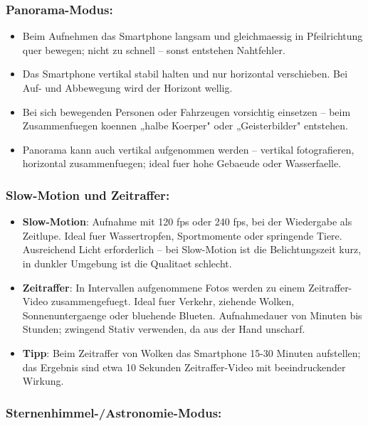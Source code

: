 \subsubsection*{Panorama-Modus:}

\begin{itemize}
  \item Beim Aufnehmen das Smartphone langsam und gleichmaessig in Pfeilrichtung quer bewegen; nicht zu schnell – sonst entstehen Nahtfehler.
  \item Das Smartphone vertikal stabil halten und nur horizontal verschieben. Bei Auf- und Abbewegung wird der Horizont wellig.
  \item Bei sich bewegenden Personen oder Fahrzeugen vorsichtig einsetzen – beim Zusammenfuegen koennen „halbe Koerper" oder „Geisterbilder" entstehen.
  \item Panorama kann auch vertikal aufgenommen werden – vertikal fotografieren, horizontal zusammenfuegen; ideal fuer hohe Gebaeude oder Wasserfaelle.
\end{itemize}

\subsubsection*{Slow-Motion und Zeitraffer:}

\begin{itemize}
  \item \textbf{Slow-Motion}: Aufnahme mit 120 fps oder 240 fps, bei der Wiedergabe als Zeitlupe. Ideal fuer Wassertropfen, Sportmomente oder springende Tiere. Ausreichend Licht erforderlich – bei Slow-Motion ist die Belichtungszeit kurz, in dunkler Umgebung ist die Qualitaet schlecht.
  \item \textbf{Zeitraffer}: In Intervallen aufgenommene Fotos werden zu einem Zeitraffer-Video zusammengefuegt. Ideal fuer Verkehr, ziehende Wolken, Sonnenuntergaenge oder bluehende Blueten. Aufnahmedauer von Minuten bis Stunden; zwingend Stativ verwenden, da aus der Hand unscharf.
  \item \textbf{Tipp}: Beim Zeitraffer von Wolken das Smartphone 15-30 Minuten aufstellen; das Ergebnis sind etwa 10 Sekunden Zeitraffer-Video mit beeindruckender Wirkung.
\end{itemize}

\subsubsection*{Sternenhimmel-/Astronomie-Modus:}

